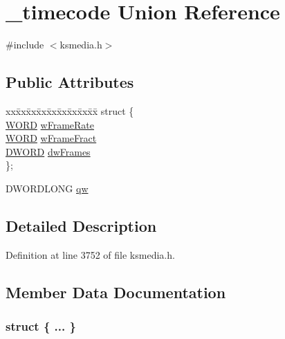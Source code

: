 \hypertarget{union__timecode}{}\section{\+\_\+timecode Union Reference}
\label{union__timecode}


{\ttfamily \#include $<$ksmedia.\+h$>$}

\subsection*{Public Attributes}
\begin{DoxyCompactItemize}
\item 
\begin{tabbing}
xx\=xx\=xx\=xx\=xx\=xx\=xx\=xx\=xx\=\kill
struct \{\\
\>\hyperlink{nfilterkit_8h_a7e62930c4614f6a59b33d693f01ce08e}{WORD} \hyperlink{union__timecode_a776934cf1779e23fb01e43b96e530e58}{wFrameRate}\\
\>\hyperlink{nfilterkit_8h_a7e62930c4614f6a59b33d693f01ce08e}{WORD} \hyperlink{union__timecode_aca27e63a70401a534265368843641277}{wFrameFract}\\
\>\hyperlink{mapinls_8h_ad342ac907eb044443153a22f964bf0af}{DWORD} \hyperlink{union__timecode_a09c86295eb935c1632398c963b156886}{dwFrames}\\
\}; \\

\end{tabbing}\item 
D\+W\+O\+R\+D\+L\+O\+NG \hyperlink{union__timecode_a1ae00c82e84c948d21717ebb5455c599}{qw}
\end{DoxyCompactItemize}


\subsection{Detailed Description}


Definition at line 3752 of file ksmedia.\+h.



\subsection{Member Data Documentation}
\subsubsection[{\texorpdfstring{"@202}{@202}}]{\setlength{\rightskip}{0pt plus 5cm}struct \{ ... \} }\hypertarget{union__timecode_ab812a4bccb46f3676d7e180f80e4f2cb}{}\label{union__timecode_ab812a4bccb46f3676d7e180f80e4f2cb}
